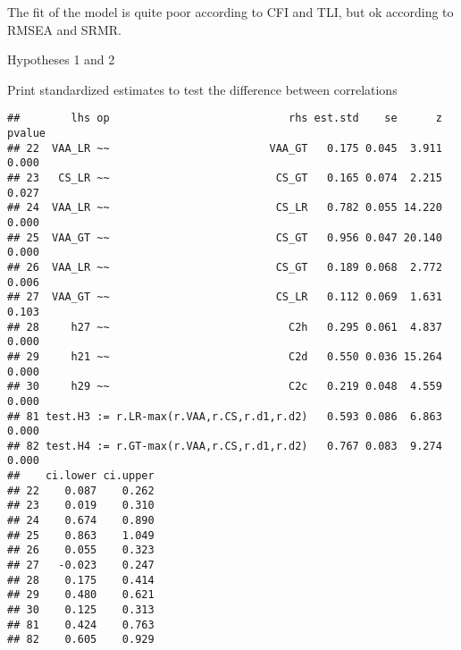 \documentclass[
]{article}
\newenvironment{Shaded}{\begin{snugshade}}{\end{snugshade}}
\newcommand{\CommentTok}[1]{\textcolor[rgb]{0.56,0.35,0.01}{\textit{#1}}}
\newcommand{\DecValTok}[1]{\textcolor[rgb]{0.00,0.00,0.81}{#1}}
\newcommand{\KeywordTok}[1]{\textcolor[rgb]{0.13,0.29,0.53}{\textbf{#1}}}
\newcommand{\NormalTok}[1]{#1}
\newcommand{\OperatorTok}[1]{\textcolor[rgb]{0.81,0.36,0.00}{\textbf{#1}}}
\newcommand{\StringTok}[1]{\textcolor[rgb]{0.31,0.60,0.02}{#1}}
\begin{document}
The fit of the model is quite poor according to CFI and TLI, but ok
according to RMSEA and SRMR.

Hypotheses 1 and 2

Print standardized estimates to test the difference between correlations

\begin{Shaded}
\end{Shaded}

\begin{verbatim}
##        lhs op                            rhs est.std    se      z pvalue
## 22  VAA_LR ~~                         VAA_GT   0.175 0.045  3.911  0.000
## 23   CS_LR ~~                          CS_GT   0.165 0.074  2.215  0.027
## 24  VAA_LR ~~                          CS_LR   0.782 0.055 14.220  0.000
## 25  VAA_GT ~~                          CS_GT   0.956 0.047 20.140  0.000
## 26  VAA_LR ~~                          CS_GT   0.189 0.068  2.772  0.006
## 27  VAA_GT ~~                          CS_LR   0.112 0.069  1.631  0.103
## 28     h27 ~~                            C2h   0.295 0.061  4.837  0.000
## 29     h21 ~~                            C2d   0.550 0.036 15.264  0.000
## 30     h29 ~~                            C2c   0.219 0.048  4.559  0.000
## 81 test.H3 := r.LR-max(r.VAA,r.CS,r.d1,r.d2)   0.593 0.086  6.863  0.000
## 82 test.H4 := r.GT-max(r.VAA,r.CS,r.d1,r.d2)   0.767 0.083  9.274  0.000
##    ci.lower ci.upper
## 22    0.087    0.262
## 23    0.019    0.310
## 24    0.674    0.890
## 25    0.863    1.049
## 26    0.055    0.323
## 27   -0.023    0.247
## 28    0.175    0.414
## 29    0.480    0.621
## 30    0.125    0.313
## 81    0.424    0.763
## 82    0.605    0.929
\end{verbatim}

\begin{Shaded}
\end{Shaded}
\end{document}
